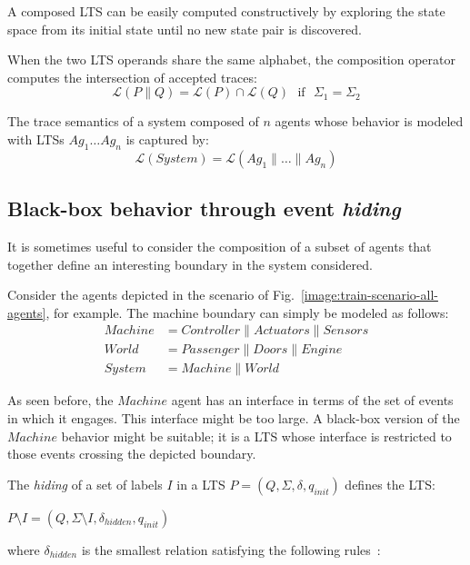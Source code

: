 A composed LTS can be easily computed constructively by exploring the state space from its initial state until no new state pair is discovered. 

When the two LTS operands share the same alphabet, the composition operator computes the intersection of accepted traces:
\begin{equation*}
\mathcal{L}(P \parallel Q) = \mathcal{L}(P) \cap \mathcal{L}(Q) \mbox{~~if~~} \Sigma_{1}=\Sigma_{2}
\end{equation*}

The trace semantics of a system composed of $n$ agents whose behavior is modeled with LTSs $Ag_1 \ldots Ag_n$ is captured by:
\begin{equation}
\mathcal{L}(System) = \mathcal{L}(Ag_1 \parallel \ldots \parallel Ag_n)
\label{equation:system-composition}
\end{equation}

\subsection{Black-box behavior through event \emph{hiding}\label{subsection:lts-hiding}}

It is sometimes useful to consider the composition of a subset of agents that together define an interesting boundary in the system considered. 

Consider the agents depicted in the scenario of Fig.~\ref{image:train-scenario-all-agents}, for example. The machine boundary can simply be modeled as follows:
\begin{align*}
Machine &= Controller \parallel Actuators \parallel Sensors \\
World   &= Passenger \parallel Doors \parallel Engine \\
System  &= Machine \parallel World
\end{align*}

As seen before, the $Machine$ agent has an interface in terms of the set of events in which it engages. This interface might be too large. A black-box version of the $Machine$ behavior might be suitable; it is a LTS whose interface is restricted to those events crossing the depicted boundary.

\begin{definition}
The \emph{hiding} of a set of labels $I$ in a LTS $P = (Q,\Sigma,\delta,q_{init})$ defines the LTS:
\begin{center}
$P \setminus I = (Q,\Sigma \setminus I,\delta_{hidden},q_{init})$
\end{center}
\noindent where $\delta_{hidden}$ is the smallest relation satisfying the following rules~\cite{Giannakopoulou:1999}:
\end{definition}

